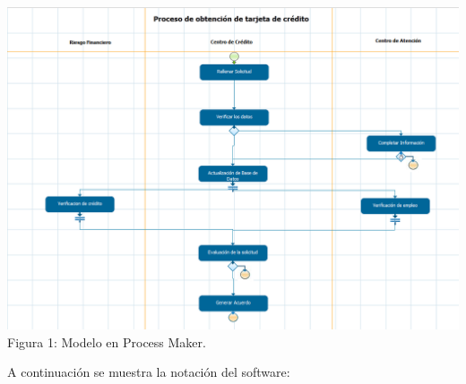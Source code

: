 \begin{center}
\includegraphics[scale=0.5]{./imagenes/modelos_pm.png}\\
     Figura 1: Modelo en Process Maker.\\
\end{center}

A continuación se muestra la notación del software:

